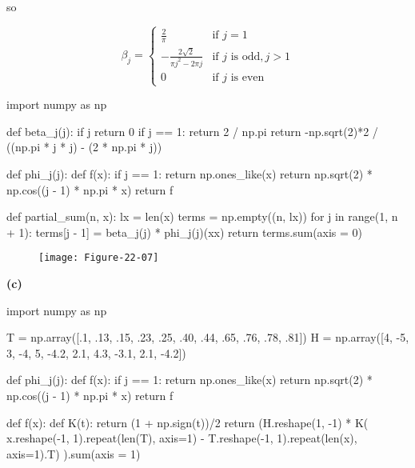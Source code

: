 so

\[ \beta_{j} = \begin{cases}
\frac{2}{\pi} & \text{if } j = 1\\
-\frac{2\sqrt{2}}{\pi j^{2} - 2 \pi j} & \text{if } j \text{ is odd}, j > 1 \\
0 & \text{if } j \text{ is even}
\end{cases} \]

\begin{python}
import numpy as np

def beta_{j}(j):
    if j %
        return 0
    if j == 1:
        return 2 / np.pi
    return -np.sqrt(2)*2 / ((np.pi * j * j) - (2 * np.pi * j))

def phi_{j}(j):
    def f(x):
        if j == 1:
            return np.ones_like(x)
        return np.sqrt(2) * np.cos((j - 1) * np.pi * x)
    return f

def partial_sum(n, x):
    lx = len(x)
    terms = np.empty((n, lx))
    for j in range(1, n + 1):
        terms[j - 1] = beta_{j}(j) * phi_{j}(j)(xx)
    return terms.sum(axis = 0)
\end{python}


\begin{figure}[H]
\centering
\texttt{[image: Figure-22-07]}
\end{figure}

\textbf{(c)}

\begin{python}
import numpy as np

T = np.array([.1, .13, .15, .23, .25, .40, .44, .65, .76, .78, .81])
H = np.array([4, -5, 3, -4, 5, -4.2, 2.1, 4.3, -3.1, 2.1, -4.2])

def phi_{j}(j):
    def f(x):
        if j == 1:
            return np.ones_like(x)
        return np.sqrt(2) * np.cos((j - 1) * np.pi * x)
    return f

def f(x):
    def K(t):
        return (1 + np.sign(t))/2
    return (H.reshape(1, -1) * K(
        x.reshape(-1, 1).repeat(len(T), axis=1) - T.reshape(-1, 1).repeat(len(x), axis=1).T)
    ).sum(axis = 1)
\end{python}


